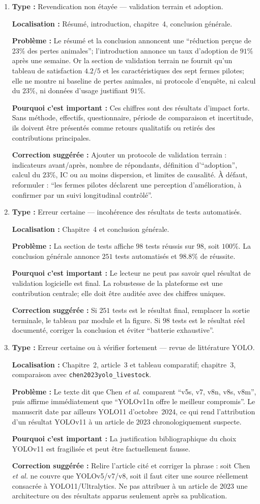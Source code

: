\documentclass[11pt,a4paper]{article}
\newcommand{\loc}[1]{\textbf{Localisation :} #1\par}
\newcommand{\prob}[1]{\textbf{Problème :} #1\par}
\newcommand{\impact}[1]{\textbf{Pourquoi c'est important :} #1\par}
\newcommand{\fix}[1]{\textbf{Correction suggérée :} #1\par}
\newcommand{\classif}[1]{\textbf{Type :} #1\par}
\begin{document}
\begin{enumerate}
  \item \classif{Revendication non étayée --- validation terrain et adoption.}
  \loc{Résumé, introduction, chapitre~4, conclusion générale.}
  \prob{Le résumé et la conclusion annoncent une \enquote{réduction perçue de 23\% des pertes animales}; l'introduction annonce un taux d'adoption de \(91\%\) après une semaine. Or la section de validation terrain ne fournit qu'un tableau de satisfaction \(4.2/5\) et les caractéristiques des sept fermes pilotes; elle ne montre ni baseline de pertes animales, ni protocole d'enquête, ni calcul du \(23\%\), ni données d'usage justifiant \(91\%\).}
  \impact{Ces chiffres sont des résultats d'impact forts. Sans méthode, effectifs, questionnaire, période de comparaison et incertitude, ils doivent être présentés comme retours qualitatifs ou retirés des contributions principales.}
  \fix{Ajouter un protocole de validation terrain : indicateurs avant/après, nombre de répondants, définition d'\enquote{adoption}, calcul du \(23\%\), IC ou au moins dispersion, et limites de causalité. À défaut, reformuler : \enquote{les fermes pilotes déclarent une perception d'amélioration, à confirmer par un suivi longitudinal contrôlé}.}

  \item \classif{Erreur certaine --- incohérence des résultats de tests automatisés.}
  \loc{Chapitre~4 et conclusion générale.}
  \prob{La section de tests affiche \(98\) tests réussis sur \(98\), soit \(100\%\). La conclusion générale annonce \(251\) tests automatisés et \(98.8\%\) de réussite.}
  \impact{Le lecteur ne peut pas savoir quel résultat de validation logicielle est final. La robustesse de la plateforme est une contribution centrale; elle doit être auditée avec des chiffres uniques.}
  \fix{Si \(251\) tests est le résultat final, remplacer la sortie terminale, le tableau par module et la figure. Si \(98\) tests est le résultat réel documenté, corriger la conclusion et éviter \enquote{batterie exhaustive}.}

  \item \classif{Erreur certaine ou à vérifier fortement --- revue de littérature YOLO.}
  \loc{Chapitre~2, article~3 et tableau comparatif; chapitre~3, comparaison avec \texttt{chen2023yolo\_livestock}.}
  \prob{Le texte dit que Chen \textit{et al.} comparent \enquote{v5s, v7, v8n, v8s, v8m}, puis affirme immédiatement que \enquote{YOLOv11n offre le meilleur compromis}. Le manuscrit date par ailleurs YOLO11 d'octobre~2024, ce qui rend l'attribution d'un résultat YOLOv11 à un article de 2023 chronologiquement suspecte.}
  \impact{La justification bibliographique du choix YOLOv11 est fragilisée et peut être factuellement fausse.}
  \fix{Relire l'article cité et corriger la phrase : soit Chen \textit{et al.} ne couvre que YOLOv5/v7/v8, soit il faut citer une source réellement consacrée à YOLO11/Ultralytics. Ne pas attribuer à un article de 2023 une architecture ou des résultats apparus seulement après sa publication.}


\end{enumerate}
\end{document}
